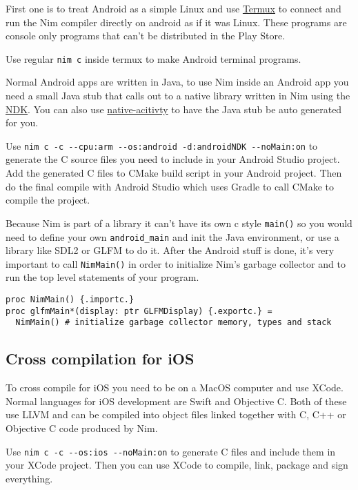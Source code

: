 First one is to treat Android as a simple Linux and use
\href{https://wiki.termux.com}{Termux} to connect and run the Nim
compiler directly on android as if it was Linux. These programs are
console only programs that can't be distributed in the Play Store.

Use regular \texttt{nim\ c} inside termux to make Android terminal
programs.

Normal Android apps are written in Java, to use Nim inside an Android
app you need a small Java stub that calls out to a native library
written in Nim using the \href{https://developer.android.com/ndk}{NDK}.
You can also use
\href{https://developer.android.com/ndk/samples/sample_na}{native-acitivty}
to have the Java stub be auto generated for you.

Use
\texttt{nim\ c\ -c\ -\/-cpu:arm\ -\/-os:android\ -d:androidNDK\ -\/-noMain:on}
to generate the C source files you need to include in your Android
Studio project. Add the generated C files to CMake build script in your
Android project. Then do the final compile with Android Studio which
uses Gradle to call CMake to compile the project.

Because Nim is part of a library it can't have its own c style
\texttt{main()} so you would need to define your own
\texttt{android\_main} and init the Java environment, or use a library
like SDL2 or GLFM to do it. After the Android stuff is done, it's very
important to call \texttt{NimMain()} in order to initialize Nim's
garbage collector and to run the top level statements of your program.

\begin{verbatim}
proc NimMain() {.importc.}
proc glfmMain*(display: ptr GLFMDisplay) {.exportc.} =
  NimMain() # initialize garbage collector memory, types and stack
\end{verbatim}

\hypertarget{cross-compilation-for-ios}{%
\subsection{Cross compilation for iOS}\label{cross-compilation-for-ios}}

To cross compile for iOS you need to be on a MacOS computer and use
XCode. Normal languages for iOS development are Swift and Objective C.
Both of these use LLVM and can be compiled into object files linked
together with C, C++ or Objective C code produced by Nim.

Use \texttt{nim\ c\ -c\ -\/-os:ios\ -\/-noMain:on} to generate C files
and include them in your XCode project. Then you can use XCode to
compile, link, package and sign everything.

